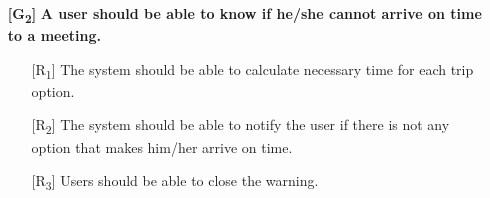 \documentclass[12pt,titlepage]{article}
\begin{document}
\begin{itemize}
\begin{itemize}
\end{itemize}
\item[\textbf{ {[G\textsubscript{2}]}}]	\textbf{	A user should be able to know if he/she cannot arrive on time to a meeting.}
\begin{itemize}
\item[{[R\textsubscript{1}]}] The system should be able to calculate necessary time for each trip option.
\item[{[R\textsubscript{2}]}]  The system should be able to notify the user if there is not any option that makes him/her arrive on time.
\item[{[R\textsubscript{3}]}] Users should be able to close the warning.
\end{itemize}


\end{itemize}
\end{document}
